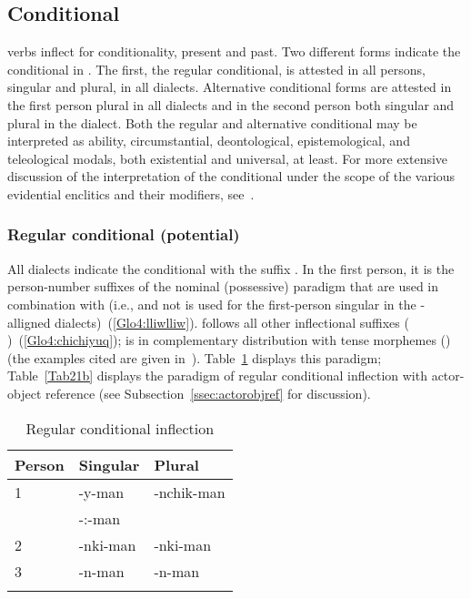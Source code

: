 \subsection{Conditional}\label{ssec:conditional}
\SYQ{} verbs inflect for conditionality, present and past. Two different forms indicate the conditional in \SYQ. The first, the regular conditional, is attested in all persons, singular and plural, in all dialects. Alternative conditional forms are attested in the first person plural in all dialects and in the second person both singular and plural in the \AMV{} dialect. Both the regular and alternative conditional may be interpreted as ability, circumstantial, deontological, epistemological, and teleological modals, both existential and universal, at least. For more extensive discussion of the interpretation of the conditional under the scope of the various evidential enclitics and their modifiers, see~.

\subsubsection{Regular conditional (potential) }\label{ssec:regcond}
All \SYQ{} dialects indicate the conditional with the suffix . In the first person, it is the person-number suffixes of the nominal (possessive) paradigm that are used in combination with  (i.e.,  and not  is used for the first-person singular in the \QII{}-alligned dialects)~(\ref{Glo4:lliwlliw}).  follows all other inflectional suffixes ( )~(\ref{Glo4:chichiyuq});  is in complementary distribution with tense morphemes () (the examples cited are given in~). Table~\ref{Tab21a} displays this paradigm; Table~\ref{Tab21b} displays the paradigm of regular conditional inflection with actor-object reference (see Subsection~\ref{ssec:actorobjref} for discussion).

\begin{table}
\small\centering
\caption{Regular conditional inflection}\label{Tab21a}
\begin{tabular}{lll}
\lsptoprule
Person		& Singular		& Plural	\\
\midrule
1	& -y-man\tss{\AMV,\LT}		& -nchik-man		\\
	& -:-man\tss{\ACH,\CH,\SP}	& 		\\[2ex]
2	& -nki-man		& -nki-man		\\[2ex]
3	& -n-man		& -n-man		\\
\lspbottomrule
\end{tabular}
\end{table}

